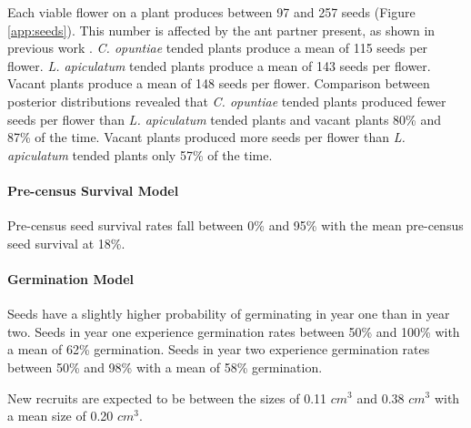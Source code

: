\documentclass[11pt]{article}
\begin{document}
Each viable flower on a plant produces between 97 and 257 seeds (Figure \ref{app:seeds}).
This number is affected by the ant partner present, as shown in previous work \citep{Ohm2014}. 
\textit{C. opuntiae} tended plants produce a mean of 115 seeds per flower. 
\textit{L. apiculatum} tended plants produce a mean of 143 seeds per flower.
Vacant plants produce a mean of 148 seeds per flower. 
Comparison between posterior distributions revealed that \textit{C. opuntiae} tended plants produced fewer seeds per flower than \textit{L. apiculatum} tended plants and vacant plants 80\% and 87\% of the time.
Vacant plants produced more seeds per flower than \textit{L. apiculatum} tended plants only 57\% of the time.

	\paragraph{Pre-census Survival Model}
	Pre-census seed survival rates fall between 0\% and 95\% with the mean pre-census seed survival at 18\%.
	
	\paragraph{Germination Model}
	Seeds have a slightly higher probability of germinating in year one than in year two.
	Seeds in year one experience germination rates between 50\% and 100\% with a mean of 62\% germination.
	Seeds in year two experience germination rates between 50\% and 98\% with a mean of 58\% germination.
	
	
	New recruits are expected to be between the sizes of 0.11 $cm^3$ and 0.38 $cm^3$ with a mean size of 0.20 $cm^3$.
\end{document}
